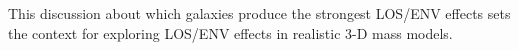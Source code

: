 This discussion about which galaxies produce the strongest LOS/ENV effects sets the context for exploring LOS/ENV effects in realistic 3-D mass models.